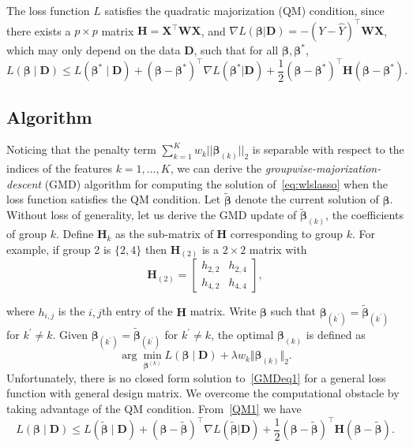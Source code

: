 \documentclass[12pt,letter]{article}\usepackage[]{graphicx}\usepackage[]{color}
\newcommand{\bX}{\textbf{X}}
\newcommand{\bD}{\textbf{D}}
\newcommand{\bH}{\textbf{H}}
\newcommand{\trans}{\top}
\newcommand{\bbeta}{\boldsymbol{\beta}}
\newcommand{\bbk}{\boldsymbol{\beta}_{(k)}}
\newcommand{\bbkt}{\widetilde{\boldsymbol{\beta}}_{(k)}}
\begin{document}
The loss function $L$ satisfies the quadratic majorization (QM) condition, since there exists
a $p\times p$ matrix $\bH=\bX^{\trans}\mathbf{W}\bX$, and $\nabla L(\bbeta|\bD)=-\left(Y-\hat{Y}\right)^{\top}\mathbf{W}\bX$, which may only depend on the data $\bD$, such that for all $\bbeta,\bbeta^{*}$,
\begin{equation}
	L(\bbeta\mid\bD)\le L(\bbeta^{*}\mid\bD)+(\bbeta-\bbeta^{*})^{\trans}\nabla L(\bbeta^{*}|\bD)+\frac{1}{2}(\bbeta-\bbeta^{*})^{\trans}\bH(\bbeta-\bbeta^{*}).\label{QM1}
\end{equation}

\subsection{Algorithm}

Noticing that the penalty term $\sum_{k=1}^{K}w_{k}||\bbeta_{(k)}||_{2}$ is separable with respect to the indices of the features $k=1, \ldots, K$, we can derive the \textit{groupwise-majorization-descent} (GMD) algorithm for computing the solution of~\eqref{eq:wlslasso} when the loss function satisfies the QM condition. Let $\widetilde{\bbeta}$ denote the current solution of $\bbeta$. Without loss of generality, let us derive the GMD update of $\bbkt$, the coefficients of group $k$. Define $\bH_{k}$ as the sub-matrix of $\bH$ corresponding to group $k$. For example, if group 2 is $\{2,4\}$ then $\bH_{(2)}$ is a $2\times2$ matrix with
\[
\bH_{(2)}=\left[\begin{array}{cc}
h_{2,2} & h_{2,4}\\
h_{4,2} & h_{4,4}
\end{array}\right],
\]

where $h_{i,j}$ is the $i,j$th entry of the $\bH$ matrix. Write $\bbeta$ such that $\bbeta_{(k^{\prime})}=\widetilde{\bbeta}_{(k^{\prime})}$ for $k^{\prime}\ne k$. Given $\bbeta_{(k^{\prime})}=\widetilde{\bbeta}_{(k^{\prime})}$ for $k^{\prime}\ne k$, the optimal $\bbk$ is defined as
\begin{equation}
	\arg\min_{\boldsymbol{\beta}^{(k)}}L(\bbeta\mid\bD)+\lambda w_{k}\Vert\bbk\Vert_{2}.\label{GMDeq1}
\end{equation}
Unfortunately, there is no closed form solution to~\eqref{GMDeq1} for a general loss function with general design matrix. We overcome the computational obstacle by taking advantage of the QM condition. From~\eqref{QM1} we have
\[
L(\bbeta\mid\bD)\le L(\widetilde{\bbeta}\mid\bD)+(\bbeta-\widetilde{\bbeta})^{\trans}\nabla L(\widetilde{\bbeta}|\bD)+\frac{1}{2}(\bbeta-\widetilde{\bbeta})^{\trans}\bH(\bbeta-\widetilde{\bbeta}).
\]
\end{document}
